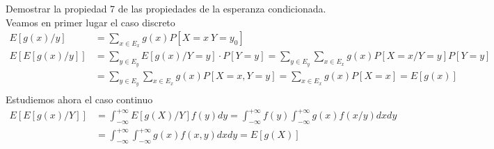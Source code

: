 \begin{ejercicio}
    Demostrar la propiedad 7 de las propiedades de la esperanza condicionada. 
    \endsquare
    Veamos en primer lugar el caso discreto
    \begin{align*}
        E[g(x)/y] &= \sum_{x \in E_x}g(x) P[X=x \ Y=y_0]\\
        E[E[g(x)/y]] &= \sum_{y\in E_y} E[g(x)/Y=y] \cdot P [Y=y] = \sum_{y\in E_y} \sum_{x\in E_x} g(x) P[X=x / Y=y] P[Y=y]\\
        &= \sum_{y\in E_y} \sum_{x\in E_x} g(x) P[X=x, Y=y] = \sum_{x\in E_x} g(x) P[X=x]  = E[g(x)]\\
    \end{align*}
    Estudiemos ahora el caso continuo
    \begin{align*}
        E[E[g(x)/Y]] &= \int_{-\infty}^{+\infty} E[g(X)/Y] f(y) dy = \int_{-\infty}^{+\infty} f(y) \int_{-\infty}^{+\infty} g(x) f(x/y) dxdy \\
        &= \int_{-\infty}^{+\infty}\int_{-\infty}^{+\infty} g(x)f(x,y)dxdy = E[g(X)]
    \end{align*}
\end{ejercicio}